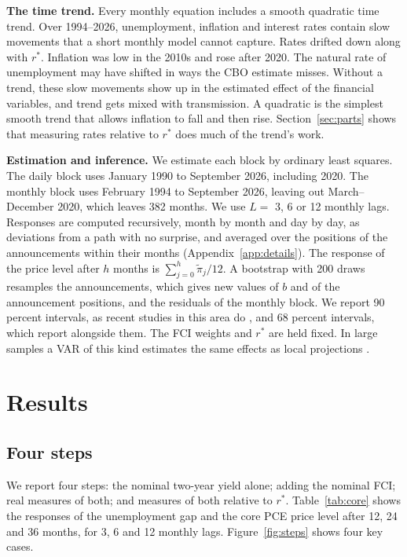 \documentclass[11pt]{article}
\newcommand{\rs}{r^{*}}
\begin{document}
\textbf{The time trend.} Every monthly equation includes a smooth quadratic time trend. Over 1994--2026, unemployment, inflation and interest rates contain slow movements that a short monthly model cannot capture. Rates drifted down along with $\rs$. Inflation was low in the 2010s and rose after 2020. The natural rate of unemployment may have shifted in ways the CBO estimate misses. Without a trend, these slow movements show up in the estimated effect of the financial variables, and trend gets mixed with transmission. A quadratic is the simplest smooth trend that allows inflation to fall and then rise. Section~\ref{sec:parts} shows that measuring rates relative to $\rs$ does much of the trend's work.

\textbf{Estimation and inference.} We estimate each block by ordinary least squares. The daily block uses January 1990 to September 2026, including 2020. The monthly block uses February 1994 to September 2026, leaving out March--December 2020, which leaves 382 months. We use $L=$ 3, 6 or 12 monthly lags. Responses are computed recursively, month by month and day by day, as deviations from a path with no surprise, and averaged over the positions of the announcements within their months (Appendix~\ref{app:details}). The response of the price level after $h$ months is $\sum_{j=0}^{h}\tilde\pi_j/12$. A bootstrap with 200 draws resamples the announcements, which gives new values of $b$ and of the announcement positions, and the residuals of the monthly block. We report 90 percent intervals, as recent studies in this area do \citep{bauer2023,caldara2019,miranda2021,ramey2016}, and 68 percent intervals, which \citet{jarocinski2020} report alongside them. The FCI weights and $\rs$ are held fixed. In large samples a VAR of this kind estimates the same effects as local projections \citep{plagborg2021}.

\section{Results}\label{sec:results}
\subsection{Four steps}\label{sec:steps}
We report four steps: the nominal two-year yield alone; adding the nominal FCI; real measures of both; and measures of both relative to $\rs$. Table~\ref{tab:core} shows the responses of the unemployment gap and the core PCE price level after 12, 24 and 36 months, for 3, 6 and 12 monthly lags. Figure~\ref{fig:steps} shows four key cases.
\end{document}
